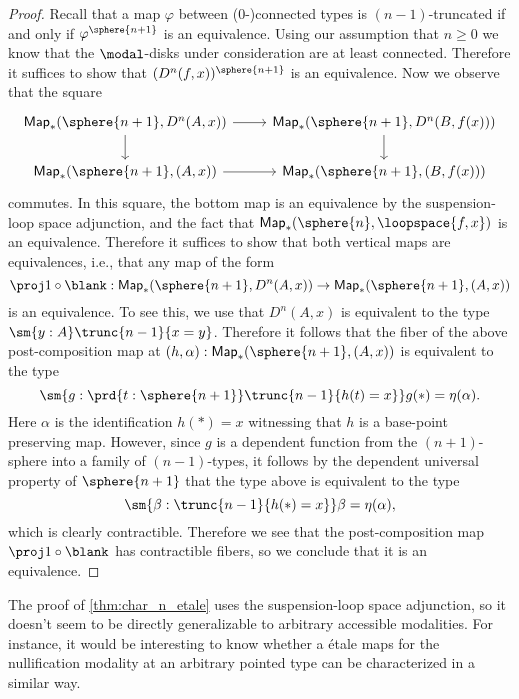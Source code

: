 \documentclass{msc}
\begin{document}
\begin{proof}
  Recall that a map $\varphi$ between ($0$-)connected types is $(n-1)$-truncated if and only if $\varphi^{\sphere{n+1}}$ is an equivalence. Using our assumption that $n\geq 0$ we know that the $\modal$-disks under consideration are at least connected. Therefore it suffices to show that $(D^{n}(f,x))^{\sphere{n+1}}$ is an equivalence. Now we observe that the square
  \begin{equation*}
    \begin{tikzcd}
      \mathsf{Map}_\ast(\sphere{n+1},D^{n}(A,x)) \arrow[r] \arrow[d] & \mathsf{Map}_\ast(\sphere{n+1},D^{n}(B,f(x))) \arrow[d] \\
      \mathsf{Map}_\ast(\sphere{n+1},(A,x)) \arrow[r] & \mathsf{Map}_\ast(\sphere{n+1},(B,f(x)))
    \end{tikzcd}
  \end{equation*}
  commutes. In this square, the bottom map is an equivalence by the suspension-loop space adjunction, and the fact that $\mathsf{Map}_\ast(\sphere{n},\loopspace{f,x})$ is an equivalence. Therefore it suffices to show that both vertical maps are equivalences, i.e., that any map of the form
  \begin{equation*}
    \proj 1\circ\blank : \mathsf{Map}_\ast(\sphere{n+1},D^{n}(A,x))\to \mathsf{Map}_\ast(\sphere{n+1},(A,x))
  \end{equation*}
  is an equivalence. To see this, we use that $D^n(A,x)$ is equivalent to the type $\sm{y:A}\trunc{n-1}{x=y}$. Therefore it follows that the fiber of the above post-composition map at $(h,\alpha):\mathsf{Map}_\ast(\sphere{n+1},(A,x))$ is equivalent to the type
  \begin{equation*}
    \sm{g:\prd{t:\sphere{n+1}}\trunc{n-1}{h(t)=x}}g(\ast)=\eta(\alpha).
  \end{equation*}
  Here $\alpha$ is the identification $h(\ast)=x$ witnessing that $h$ is a base-point preserving map. However, since $g$ is a dependent function from the $(n+1)$-sphere into a family of $(n-1)$-types, it follows by the dependent universal property of $\sphere{n+1}$ that the type above is equivalent to the type
  \begin{equation*}
    \sm{\beta:\trunc{n-1}{h(\ast)=x}}\beta=\eta(\alpha),
  \end{equation*}
  which is clearly contractible. Therefore we see that the post-composition map $\proj 1\circ\blank$ has contractible fibers, so we conclude that it is an equivalence.
\end{proof}

The proof of \cref{thm:char_n_etale} uses the suspension-loop space adjunction, so it doesn't seem to be directly generalizable to arbitrary accessible modalities. For instance, it would be interesting to know whether a \'etale maps for the nullification modality at an arbitrary pointed type can be characterized in a similar way.
\end{document}
